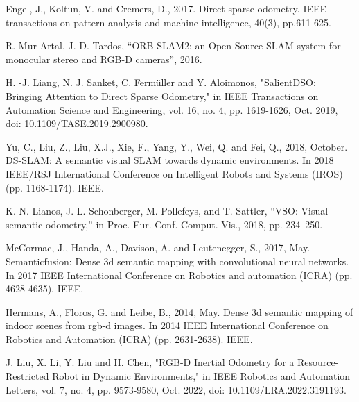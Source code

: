 \documentclass[conference]{IEEEtran}
\begin{document}
%
%
%
\begin{thebibliography}{1}


Engel, J., Koltun, V. and Cremers, D., 2017. Direct sparse odometry. IEEE transactions on pattern analysis and machine intelligence, 40(3), pp.611-625.

R. Mur-Artal, J. D. Tardos, ``ORB-SLAM2: an Open-Source SLAM system for monocular stereo and RGB-D cameras'', 2016.


H. -J. Liang, N. J. Sanket, C. Fermüller and Y. Aloimonos, "SalientDSO: Bringing Attention to Direct Sparse Odometry," in IEEE Transactions on Automation Science and Engineering, vol. 16, no. 4, pp. 1619-1626, Oct. 2019, doi: 10.1109/TASE.2019.2900980.

Yu, C., Liu, Z., Liu, X.J., Xie, F., Yang, Y., Wei, Q. and Fei, Q., 2018, October. DS-SLAM: A semantic visual SLAM towards dynamic environments. In 2018 IEEE/RSJ International Conference on Intelligent Robots and Systems (IROS) (pp. 1168-1174). IEEE.

K.-N. Lianos, J. L. Schonberger, M. Pollefeys, and T. Sattler, “VSO: Visual
semantic odometry,” in Proc. Eur. Conf. Comput. Vis., 2018, pp. 234–250.

McCormac, J., Handa, A., Davison, A. and Leutenegger, S., 2017, May. Semanticfusion: Dense 3d semantic mapping with convolutional neural networks. In 2017 IEEE International Conference on Robotics and automation (ICRA) (pp. 4628-4635). IEEE.

Hermans, A., Floros, G. and Leibe, B., 2014, May. Dense 3d semantic mapping of indoor scenes from rgb-d images. In 2014 IEEE International Conference on Robotics and Automation (ICRA) (pp. 2631-2638). IEEE.

J. Liu, X. Li, Y. Liu and H. Chen, "RGB-D Inertial Odometry for a Resource-Restricted Robot in Dynamic Environments," in IEEE Robotics and Automation Letters, vol. 7, no. 4, pp. 9573-9580, Oct. 2022, doi: 10.1109/LRA.2022.3191193.


\end{thebibliography}
\end{document}
